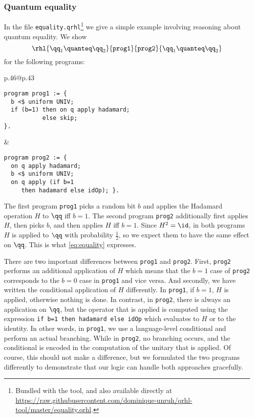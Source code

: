 \documentclass{article}
\newcommand\giturl[1]{\url{https://raw.githubusercontent.com/dominique-unruh/qrhl-tool/master/#1}}
\begin{document}

\subsubsection{Quantum equality}
\label{sec:qeq.example}

In the file \texttt{equality.qrhl}\footnote{Bundled with the tool, and
  also available directly at \giturl{equality.qrhl}.} we give a simple
example involving reasoning about quantum equality. We show
\begin{equation}\label{eq:equality}
\rhl{\qq_1\quanteq\qq_2}{\mathtt{prog1}}{\mathtt{prog2}}{\qq_1\quanteq\qq_2}
\end{equation}
for the following programs:

{\centering
    \lstset{aboveskip=0pt,belowskip=0pt}
\begin{tabular}{p{.46\hsize}@{\hskip40pt}p{.43\hsize}}
  \begin{lstlisting}
program prog1 := {
  b <$ uniform UNIV;
  if (b=1) then on q apply hadamard;
           else skip;
}.
  \end{lstlisting}%
  &
  \begin{lstlisting}
program prog2 := {
  on q apply hadamard;
  b <$ uniform UNIV;
  on q apply (if b=1
     then hadamard else idOp); }.
  \end{lstlisting}%
\end{tabular}
}

The first program \texttt{prog1} picks a random bit $b$
and applies the Hadamard operation $H$
to $\qq$
iff $b=1$.
The second program \texttt{prog2} additionally first applies $H$,
then picks $b$,
and then applies $H$
iff $b=1$.
Since $H^2=\id$,
in both programs $H$
is applied to $\qq$
with probability $\frac12$,
so we expect them to have the same effect on $\qq$.
This is what \eqref{eq:equality} expresses.

There are two important differences between \texttt{prog1} and
\texttt{prog2}. First, \texttt{prog2} performs an additional
application of $H$
which means that the $b=1$
case of \texttt{prog2} corresponds to the $b=0$
case in \texttt{prog1} and vice versa. And secondly, we have written
the conditional application of $H$
differently.  In \texttt{prog1}, if $b=1$,
$H$
is applied, otherwise nothing is done.  In contrast, in
\texttt{prog2}, there is always an application on $\qq$,
but the operator that is applied is computed using the expression
\texttt{if b=1 then hadamard else idOp} which evaluates to $H$
or to the identity. In other words, in \texttt{prog1}, we use a
language-level conditional and perform an actual branching. While in
\texttt{prog2}, no branching occurs, and the conditional is encoded in
the computation of the unitary that is applied. Of course, this should
not make a difference, but we formulated the two programs differently
to demonstrate that our logic can handle both approaches gracefully.
\end{document}
